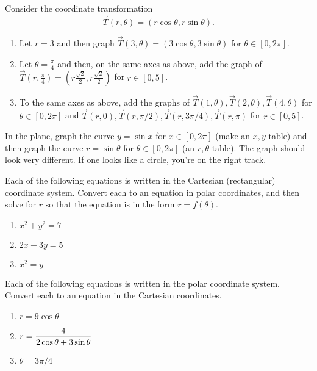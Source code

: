 \begin{problem} \label{polar coordinate transformation graph}
Consider the coordinate transformation $$\vec T(r,\theta) = (r\cos\theta,r\sin\theta).$$ 
\begin{enumerate}
\item Let $r=3$ and then graph $\vec T(3,\theta)=(3\cos\theta,3\sin\theta)$ for $\theta\in[0,2\pi]$.
\item Let $\theta=\frac{\pi}{4}$ and then, on the same axes as above, add the graph of 
$\vec T\left(r,\frac{\pi}{4}\right)=\left(r\frac{\sqrt 2}{2},r \frac{\sqrt 2}{2}\right)$ for $r\in[0,5]$.
\item To the same axes as above, add the graphs of 
$\vec T(1,\theta), \vec T(2,\theta), \vec T(4,\theta)$  for $\theta\in[0,2\pi]$ and 
$\vec T(r,0), \vec T(r,\pi/2), \vec T(r,3\pi/4), \vec T(r,\pi)$ for $r\in[0,5]$. 
\end{enumerate}
\end{problem}


\begin{problem} 
In the plane, graph the curve $y=\sin x$ for $x\in[0,2\pi]$ (make an $x,y$ table) and then graph the curve $r=\sin\theta$ for $\theta\in[0,2\pi]$ (an $r,\theta$ table).  The graph should look very different.  If one looks like a circle, you're on the right track.  
\end{problem}

\begin{problem}
%
Each of the following equations is written in the Cartesian (rectangular) coordinate system.  Convert each to an equation in polar coordinates, and then solve for $r$ so that the equation is in the form $r=f(\theta)$.
\begin{enumerate}
\item $x^2+y^2=7$
\item $2x+3y=5$
\item $x^2=y$
\end{enumerate}
\end{problem}

\begin{problem} 
%
Each of the following equations is written in the polar coordinate system.  Convert each to an equation in the Cartesian coordinates.
\begin{enumerate}
\item $r=9\cos\theta$
\item $\displaystyle r=\frac{4}{2\cos\theta+3\sin\theta}$
\item $\theta = 3\pi/4$
\end{enumerate}
\end{problem}

